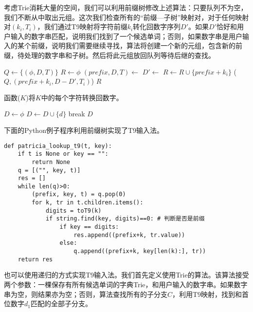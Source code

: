 \documentclass[UTF8]{article}
\begin{document}
考虑Trie消耗大量的空间，我们可以利用前缀树修改上述算法：只要队列不为空，我们不断从中取出元组。这次我们检查所有的“前缀—子树”映射对，对于任何映射对$(k_i, T_i)$，我们通过T9映射将字符前缀$k_i$转化回数字序列$D'$。如果$D'$恰好和用户输入的数字串匹配，说明我们找到了一个候选单词；否则，如果数字串是用户输入的某个前缀，说明我们需要继续寻找，算法将创建一个新的元组，包含新的前缀，待处理的数字串和子树。然后将此元组放回队列等待后继的查找。

\begin{algorithmic}[1]
  \State $Q \gets \{(\phi, D, T)\}$
  \State $R \gets \phi$
    \State $(prefix, D, T) \gets$ 
      \State $D' \gets$ 
       
          \State $R \gets R \cup \{prefix + k_i\}$
        \Else
          \State {}($Q, (prefix + k_i, D - D', T_i)$)
        \EndIf
      \EndIf
    \EndFor
  \EndWhile
  \State \Return $R$
\EndFunction
\end{algorithmic}

函数($K$)将$K$中的每个字符转换回数字。

\begin{algorithmic}[1]
  \State $D \gets \phi$
         \State $D \gets D \cup \{d\}$
         \State break
       \EndIf
     \EndFor
  \EndFor
  \State \Return $D$
\EndFunction
\end{algorithmic}

下面的Python例子程序利用前缀树实现了T9输入法。

\lstset{language=Python}
\begin{lstlisting}
def patricia_lookup_t9(t, key):
    if t is None or key == "":
        return None
    q = [("", key, t)]
    res = []
    while len(q)>0:
        (prefix, key, t) = q.pop(0)
        for k, tr in t.children.items():
            digits = toT9(k)
            if string.find(key, digits)==0: # 判断是否是前缀
                if key == digits:
                    res.append((prefix+k, tr.value))
                else:
                    q.append((prefix+k, key[len(k):], tr))
    return res
\end{lstlisting}

也可以使用递归的方式实现T9输入法。我们首先定义使用Trie的算法。该算法接受两个参数：一棵保存有所有候选单词的字典Trie，和用户输入的数字串。如果数字串为空，则结果亦为空；否则，算法查找所有的子分支$C$，利用T9映射，找到和首位数字$d_1$匹配的全部子分支。
\end{document}
